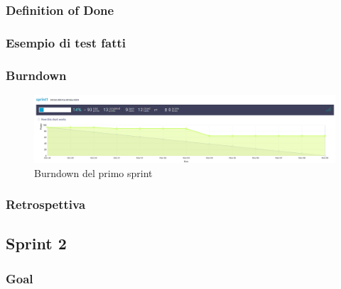 \documentclass{article}
\begin{document}
\subsubsection{Definition of Done}

\subsubsection{Esempio di test fatti}

\subsubsection{Burndown}
\begin{figure}[H]
    \centering
    \includegraphics[width=1\textwidth]{burndown1}
    \caption{Burndown del primo sprint}
    \label{fig:burndown1}
\end{figure}

\subsubsection{Retrospettiva}

\subsection{Sprint 2}

\subsubsection{Goal}
\end{document}
